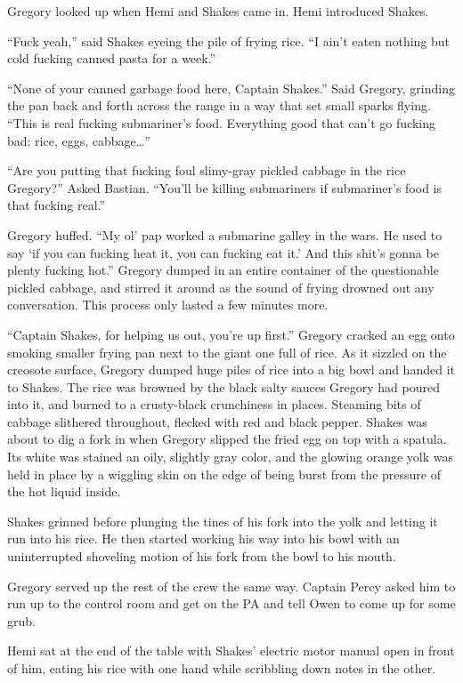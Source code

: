 \documentclass[]{scrbook}
\begin{document}
Gregory looked up when Hemi and Shakes came in. Hemi introduced Shakes.

``Fuck yeah,'' said Shakes eyeing the pile of frying rice. ``I ain't
eaten nothing but cold fucking canned pasta for a week.''

``None of your canned garbage food here, Captain Shakes.'' Said Gregory,
grinding the pan back and forth across the range in a way that set small
sparks flying. ``This is real fucking submariner's food. Everything good
that can't go fucking bad: rice, eggs, cabbage\ldots{}''

``Are you putting that fucking foul slimy-gray pickled cabbage in the
rice Gregory?'' Asked Bastian. ``You'll be killing submariners if
submariner's food is that fucking real.''

Gregory huffed. ``My ol' pap worked a submarine galley in the wars. He
used to say `if you can fucking heat it, you can fucking eat it.' And
this shit's gonna be plenty fucking hot.'' Gregory dumped in an entire
container of the questionable pickled cabbage, and stirred it around as
the sound of frying drowned out any conversation. This process only
lasted a few minutes more.

``Captain Shakes, for helping us out, you're up first.'' Gregory cracked
an egg onto smoking smaller frying pan next to the giant one full of
rice. As it sizzled on the creosote surface, Gregory dumped huge piles
of rice into a big bowl and handed it to Shakes. The rice was browned by
the black salty sauces Gregory had poured into it, and burned to a
crusty-black crunchiness in places. Steaming bits of cabbage slithered
throughout, flecked with red and black pepper. Shakes was about to dig a
fork in when Gregory slipped the fried egg on top with a spatula. Its
white was stained an oily, slightly gray color, and the glowing orange
yolk was held in place by a wiggling skin on the edge of being burst
from the pressure of the hot liquid inside.

Shakes grinned before plunging the tines of his fork into the yolk and
letting it run into his rice. He then started working his way into his
bowl with an uninterrupted shoveling motion of his fork from the bowl to
his mouth.

Gregory served up the rest of the crew the same way. Captain Percy asked
him to run up to the control room and get on the PA and tell Owen to
come up for some grub.

Hemi sat at the end of the table with Shakes' electric motor manual open
in front of him, eating his rice with one hand while scribbling down
notes in the other.
\end{document}
